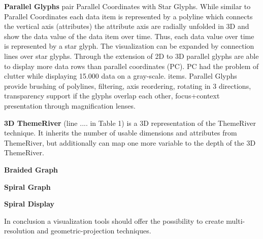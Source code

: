 \textbf{Parallel Glyphs} pair Parallel Coordinates with Star Glyphs. While similar to Parallel Coordinates each data item is represented by a polyline which connects the vertical axis (attributes) the attribute axis are radially unfolded in 3D and show the data value of the data item over time. Thus, each data value over time is represented by a star glyph. The visualization can be expanded by connection lines over star glyphs. Through the extension of 2D to 3D parallel glyphs are able to display more data rows than parallel coordinates (PC). PC had the problem of clutter while displaying 15.000 data on a gray-scale.  items\cite{Keimb}.
Parallel Glyphs provide brushing of polylines, filtering, axis reordering, rotating in 3 directions, transparency support if the glyphs overlap each other, focus+context presentation through magnification lenses.

\textbf{3D ThemeRiver} (line .... in Table 1) is a 3D representation of the ThemeRiver technique. It inherits the number of usable dimensions and attributes from ThemeRiver, but additionally can map one more variable to the depth of the 3D ThemeRiver.

\textbf{Braided Graph}

\textbf{Spiral Graph}

\cite{Weber2001}

\textbf{Spiral Display}
\cite{Carlis}


In conclusion a visualization tools should offer the possibility to create multi-resolution and geometric-projection techniques. 

